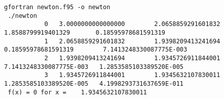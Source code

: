 \begin{Verbatim}[frame=lines,label=newton - commands and output]
 gfortran newton.f95 -o newton
 ./newton
           0   3.0000000000000000        2.0658859291601832        1.8588799919401329       0.18595978681591319     
           1   2.0658859291601832        1.9398209413241694       0.18595978681591319        7.1413248330087775E-003
           2   1.9398209413241694        1.9345726911844001        7.1413248330087775E-003   1.2853585103389520E-005
           3   1.9345726911844001        1.9345632107830011        1.2853585103389520E-005   4.1998293731637659E-011
 f(x) = 0 for x =    1.9345632107830011     
\end{Verbatim}
